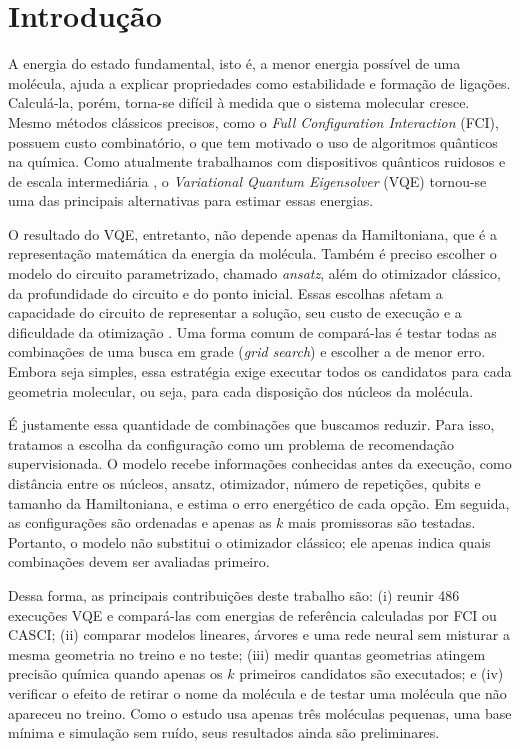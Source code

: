 \section{Introdução}

A energia do estado fundamental, isto é, a menor energia possível de uma
molécula, ajuda a explicar propriedades como estabilidade e formação de
ligações. Calculá-la, porém, torna-se difícil à medida que o sistema molecular
cresce. Mesmo métodos clássicos precisos, como o \textit{Full Configuration
Interaction} (FCI), possuem custo combinatório, o que tem motivado o uso de
algoritmos quânticos na química. Como atualmente trabalhamos com dispositivos
quânticos ruidosos e de escala intermediária \cite{preskill2018nisq}, o
\textit{Variational Quantum Eigensolver} (VQE) \cite{peruzzo2014variational}
tornou-se uma das principais alternativas para estimar essas energias.

O resultado do VQE, entretanto, não depende apenas da Hamiltoniana, que é a
representação matemática da energia da molécula. Também é preciso escolher o
modelo do circuito parametrizado, chamado \textit{ansatz}, além do otimizador
clássico, da profundidade do circuito e do ponto inicial. Essas escolhas afetam
a capacidade do circuito de representar a solução, seu custo de execução e a
dificuldade da otimização \cite{cerezo2021variational}. Uma forma comum de
compará-las é testar todas as combinações de uma busca em grade
(\textit{grid search}) e escolher a de menor erro. Embora seja simples, essa
estratégia exige executar todos os candidatos para cada geometria molecular,
ou seja, para cada disposição dos núcleos da molécula.

É justamente essa quantidade de combinações que buscamos reduzir. Para isso,
tratamos a escolha da configuração como um problema de recomendação
supervisionada. O modelo recebe informações conhecidas antes da execução, como
distância entre os núcleos, ansatz, otimizador, número de repetições, qubits e
tamanho da Hamiltoniana, e estima o erro energético de cada opção. Em seguida,
as configurações são ordenadas e apenas as $k$ mais promissoras são testadas.
Portanto, o modelo não substitui o otimizador clássico; ele apenas indica quais
combinações devem ser avaliadas primeiro.

Dessa forma, as principais contribuições deste trabalho são: (i) reunir 486
execuções VQE e compará-las com energias de referência calculadas por FCI ou
CASCI; (ii) comparar modelos lineares, árvores e uma rede neural sem misturar a
mesma geometria no treino e no teste; (iii) medir quantas geometrias atingem
precisão química quando apenas os $k$ primeiros candidatos são executados; e
(iv) verificar o efeito de retirar o nome da molécula e de testar uma molécula
que não apareceu no treino. Como o estudo usa apenas três moléculas pequenas,
uma base mínima e simulação sem ruído, seus resultados ainda são preliminares.